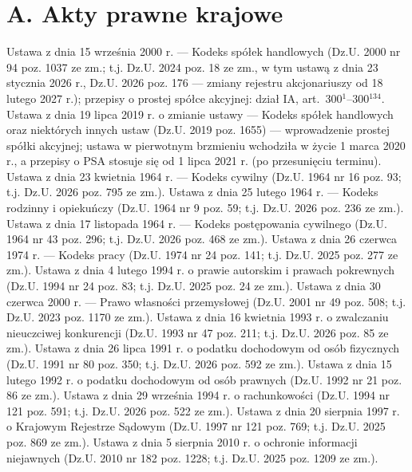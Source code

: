 \section*{A. Akty prawne krajowe}
\begin{BibList}
 Ustawa z dnia 15 września 2000 r. --- Kodeks spółek handlowych (Dz.U. 2000 nr 94 poz. 1037 ze zm.; t.j. Dz.U. 2024 poz. 18 ze zm., w tym ustawą z dnia 23 stycznia 2026 r., Dz.U. 2026 poz. 176 --- zmiany rejestru akcjonariuszy od 18 lutego 2027 r.); przepisy o prostej spółce akcyjnej: dział IA, art.~300$^{1}$--300$^{134}$.
 Ustawa z dnia 19 lipca 2019 r. o zmianie ustawy --- Kodeks spółek handlowych oraz niektórych innych ustaw (Dz.U. 2019 poz. 1655) --- wprowadzenie prostej spółki akcyjnej; ustawa w pierwotnym brzmieniu wchodziła w życie 1 marca 2020 r., a przepisy o PSA stosuje się od 1 lipca 2021 r. (po przesunięciu terminu).
 Ustawa z dnia 23 kwietnia 1964 r. --- Kodeks cywilny (Dz.U. 1964 nr 16 poz. 93; t.j. Dz.U. 2026 poz. 795 ze zm.).
 Ustawa z dnia 25 lutego 1964 r. --- Kodeks rodzinny i opiekuńczy (Dz.U. 1964 nr 9 poz. 59; t.j. Dz.U. 2026 poz. 236 ze zm.).
 Ustawa z dnia 17 listopada 1964 r. --- Kodeks postępowania cywilnego (Dz.U. 1964 nr 43 poz. 296; t.j. Dz.U. 2026 poz. 468 ze zm.).
 Ustawa z dnia 26 czerwca 1974 r. --- Kodeks pracy (Dz.U. 1974 nr 24 poz. 141; t.j. Dz.U. 2025 poz. 277 ze zm.).
 Ustawa z dnia 4 lutego 1994 r. o prawie autorskim i prawach pokrewnych (Dz.U. 1994 nr 24 poz. 83; t.j. Dz.U. 2025 poz. 24 ze zm.).
 Ustawa z dnia 30 czerwca 2000 r. --- Prawo własności przemysłowej (Dz.U. 2001 nr 49 poz. 508; t.j. Dz.U. 2023 poz. 1170 ze zm.).
 Ustawa z dnia 16 kwietnia 1993 r. o zwalczaniu nieuczciwej konkurencji (Dz.U. 1993 nr 47 poz. 211; t.j. Dz.U. 2026 poz. 85 ze zm.).
 Ustawa z dnia 26 lipca 1991 r. o podatku dochodowym od osób fizycznych (Dz.U. 1991 nr 80 poz. 350; t.j. Dz.U. 2026 poz. 592 ze zm.).
 Ustawa z dnia 15 lutego 1992 r. o podatku dochodowym od osób prawnych (Dz.U. 1992 nr 21 poz. 86 ze zm.).
 Ustawa z dnia 29 września 1994 r. o rachunkowości (Dz.U. 1994 nr 121 poz. 591; t.j. Dz.U. 2026 poz. 522 ze zm.).
 Ustawa z dnia 20 sierpnia 1997 r. o Krajowym Rejestrze Sądowym (Dz.U. 1997 nr 121 poz. 769; t.j. Dz.U. 2025 poz. 869 ze zm.).
 Ustawa z dnia 5 sierpnia 2010 r. o ochronie informacji niejawnych (Dz.U. 2010 nr 182 poz. 1228; t.j. Dz.U. 2025 poz. 1209 ze zm.).

\end{BibList}
